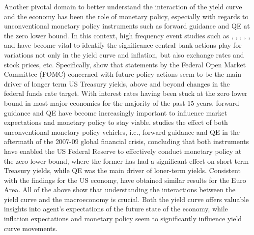 Another pivotal domain to better understand the interaction of the yield curve and the economy has been  the role of monetary policy, especially with regards to unconventional monetary policy instruments such as forward guidance and QE at the zero lower bound. 
In this context, high frequency event studies such as \citet{gurkaynak2005actions}, \citet{Nakamura_2018}, \citet{ALTAVILLA2019162}, \citet{jarocinski2020deconstructing}, \citet{SWANSON202132}, and \citet{bauer_swanson_2023} have become vital to identify the significance central bank actions play for variations not only in the yield curve and inflation, but also exchange rates and stock prices, etc. 
Specifically, \citet{gurkaynak2005actions} show that statements by the Federal Open Market Committee (FOMC) concerned with future policy actions seem to be the main driver of longer term US Treasury yields, above and beyond changes in the federal funds rate target.
With interest rates having been stuck at the zero lower bound in most major economies for the majority of the past 15 years, forward guidance and QE have become increasingly important to influence market expectations and monetary policy to stay viable. \citet{SWANSON202132} studies the effect of both unconventional monetary policy vehicles, i.e., forward guidance and QE in the aftermath of the 2007-09 global financial crisis, concluding that both instruments have enabled the US Federal Reserve to effectively conduct monetary policy at the zero lower bound, where the former has had a significant effect on short-term Treasury yields, while QE was the main driver of loner-term yields. 
Consistent with the findings for the US economy, \citet{ALTAVILLA2019162} have obtained similar results for the Euro Area. 
All of the above show that understanding the interactions between the yield curve and the macroeconomy is crucial.
Both the yield curve offers valuable insights into agent's expectations of the future state of the economy, while inflation expectations and monetary policy seem to significantly influence yield curve movements. 




